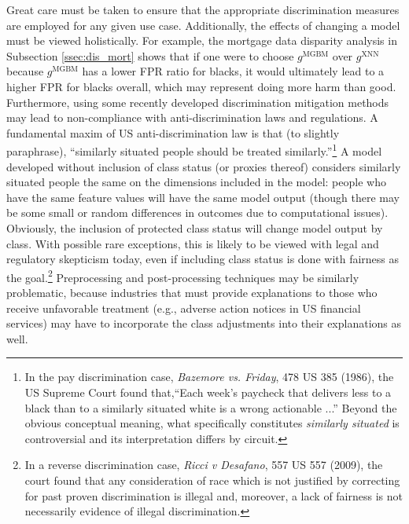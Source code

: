 \documentclass[information,article,submit,moreauthors,pdftex]{definitions/mdpi}
\begin{document}
Great care must be taken to ensure that the appropriate discrimination measures are employed for any given use case. Additionally, the effects of changing a model must be viewed holistically.  For example, the mortgage data disparity analysis in Subsection \ref{ssec:dis_mort} shows that if one were to choose $g^\text{MGBM}$ over $g^\text{XNN}$ because $g^\text{MGBM}$ has a lower FPR ratio for blacks, it would ultimately lead to a higher FPR for blacks overall, which may represent doing more harm than good. Furthermore, using some recently developed discrimination mitigation methods may lead to non-compliance with anti-discrimination laws and regulations.  A fundamental maxim of US anti-discrimination law is that (to slightly paraphrase), ``similarly situated people should be treated similarly.''\footnote{In the pay discrimination case, \textit{Bazemore vs. Friday}, 478 US 385 (1986), the US Supreme Court found that,``Each week's paycheck that delivers less to a black than to a similarly situated white is a wrong actionable ...''  Beyond the obvious conceptual meaning, what specifically constitutes \textit{similarly situated} is controversial and its interpretation differs by circuit.} A model developed without inclusion of class status (or proxies thereof) considers similarly situated people the same on the dimensions included in the model: people who have the same feature values will have the same model output (though there may be some small or random differences in outcomes due to computational issues). Obviously, the inclusion of protected class status will change model output by class. With possible rare exceptions, this is likely to be viewed with legal and regulatory skepticism today, even if including class status is done with fairness as the goal.\footnote{In a reverse discrimination case, \textit{Ricci v Desafano}, 557 US 557 (2009), the court found that any consideration of race which is not justified by correcting for past proven discrimination is illegal and, moreover, a lack of fairness is not necessarily evidence of illegal discrimination.}  Preprocessing and post-processing techniques may be similarly problematic, because industries that must provide explanations to those who receive unfavorable treatment (e.g., adverse action notices in US financial services) may have to incorporate the class adjustments into their explanations as well.




\end{document}
